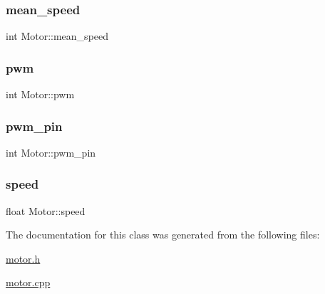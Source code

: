 \mbox{\label{class_motor_a6425f6db2380fbc7291d6866bef0b5d2}} 
\subsubsection{\texorpdfstring{mean\+\_\+speed}{mean\_speed}}
{\footnotesize\ttfamily int Motor\+::mean\+\_\+speed}

\mbox{\label{class_motor_aef307daeabd4eee18f890b0df79c5b2b}} 
\subsubsection{\texorpdfstring{pwm}{pwm}}
{\footnotesize\ttfamily int Motor\+::pwm}

\mbox{\label{class_motor_a140443a1dcef9aef92dbfc5a8190b2a4}} 
\subsubsection{\texorpdfstring{pwm\+\_\+pin}{pwm\_pin}}
{\footnotesize\ttfamily int Motor\+::pwm\+\_\+pin}

\mbox{\label{class_motor_aee22669add18744bbddbd2bb267bce13}} 
\subsubsection{\texorpdfstring{speed}{speed}}
{\footnotesize\ttfamily float Motor\+::speed}



The documentation for this class was generated from the following files\+:\begin{DoxyCompactItemize}
\item 
\hyperlink{motor_8h}{motor.\+h}\item 
\hyperlink{motor_8cpp}{motor.\+cpp}\end{DoxyCompactItemize}
